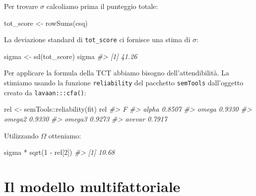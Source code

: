 \documentclass[
  11pt,
]{krantz}
\makeatletter
\newenvironment{Shaded}{\begin{snugshade}}{\end{snugshade}}
\newcommand{\CommentTok}[1]{\textcolor[rgb]{0.37,0.37,0.37}{\textit{#1}}}
\newcommand{\DecValTok}[1]{\textcolor[rgb]{0.06,0.06,0.06}{#1}}
\newcommand{\FunctionTok}[1]{\textcolor[rgb]{0,0,0}{#1}}
\newcommand{\NormalTok}[1]{#1}
\newcommand{\OtherTok}[1]{\textcolor[rgb]{0.37,0.37,0.37}{#1}}
\newcommand{\SpecialCharTok}[1]{\textcolor[rgb]{0,0,0}{#1}}
\newenvironment{kframe}{%
\medskip{}
\setlength{\fboxsep}{.8em}
 \def\at@end@of@kframe{}%
 \ifinner\ifhmode%
  \def\at@end@of@kframe{\end{minipage}}%
  \begin{minipage}{\columnwidth}%
 \fi\fi%
 \def\FrameCommand##1{\hskip\@totalleftmargin \hskip-\fboxsep
 \colorbox{shadecolor}{##1}\hskip-\fboxsep
     \hskip-\linewidth \hskip-\@totalleftmargin \hskip\columnwidth}%
 \MakeFramed {\advance\hsize-\width
   \@totalleftmargin\z@ \linewidth\hsize
   \@setminipage}}%
 {\par\unskip\endMakeFramed%
 \at@end@of@kframe}
\renewenvironment{Shaded}{\begin{kframe}}{\end{kframe}}
\theoremstyle{definition}
\theoremstyle{definition}
\theoremstyle{definition}
\theoremstyle{definition}
\theoremstyle{remark}
\makeatother
\begin{document}
Per trovare \(\sigma\) calcoliamo prima il punteggio totale:

\begin{Shaded}
\begin{Highlighting}[]
\NormalTok{tot\_score }\OtherTok{\textless{}{-}} \FunctionTok{rowSums}\NormalTok{(csq)}
\end{Highlighting}
\end{Shaded}

La deviazione standard di \texttt{tot\_score} ci fornisce una stima di \(\sigma\):

\begin{Shaded}
\begin{Highlighting}[]
\NormalTok{sigma }\OtherTok{\textless{}{-}} \FunctionTok{sd}\NormalTok{(tot\_score)}
\NormalTok{sigma}
\CommentTok{\#\textgreater{} [1] 41.26}
\end{Highlighting}
\end{Shaded}

Per applicare la formula della TCT abbiamo bisogno dell'attendibilità. La stimiamo usando la funzione \texttt{reliability} del pacchetto \texttt{semTools} dall'oggetto creato da \texttt{lavaan:::cfa()}:

\begin{Shaded}
\begin{Highlighting}[]
\NormalTok{rel }\OtherTok{\textless{}{-}}\NormalTok{ semTools}\SpecialCharTok{::}\FunctionTok{reliability}\NormalTok{(fit)}
\NormalTok{rel}
\CommentTok{\#\textgreater{}             F}
\CommentTok{\#\textgreater{} alpha  0.8507}
\CommentTok{\#\textgreater{} omega  0.9330}
\CommentTok{\#\textgreater{} omega2 0.9330}
\CommentTok{\#\textgreater{} omega3 0.9273}
\CommentTok{\#\textgreater{} avevar 0.7917}
\end{Highlighting}
\end{Shaded}

Utilizzando \(\Omega\) otteniamo:

\begin{Shaded}
\begin{Highlighting}[]
\NormalTok{sigma }\SpecialCharTok{*} \FunctionTok{sqrt}\NormalTok{(}\DecValTok{1} \SpecialCharTok{{-}}\NormalTok{ rel[}\DecValTok{2}\NormalTok{])}
\CommentTok{\#\textgreater{} [1] 10.68}
\end{Highlighting}
\end{Shaded}

\hypertarget{ch:mod_multifattoriale}{%
\chapter{Il modello multifattoriale}\label{ch:mod_multifattoriale}}
\end{document}
